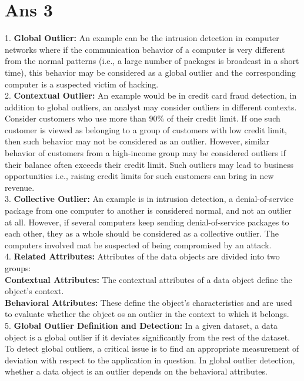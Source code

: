 \documentclass[10pt]{article}
\begin{document}
\section*{Ans 3}
\begin{flushleft}
1. \textbf{Global Outlier:} An example can be the intrusion detection in computer networks where if the communication behavior of a computer is very different from the normal patterns (i.e., a large number of packages is broadcast in a short time), this behavior may be considered as a global outlier and the corresponding computer is a suspected victim of hacking.\\
\vspace{0.5em}
2. \textbf{Contextual Outlier:} An example would be in credit card fraud detection, in addition to global outliers, an analyst may consider outliers in different contexts. Consider customers who use more than 90\% of their credit limit. If one such customer is viewed as belonging to a group of customers with low credit limit, then such behavior may not be considered as an outlier. However, similar behavior of customers from a high-income group may be considered outliers if their balance often exceeds their credit limit. Such outliers may lead to business opportunities i.e., raising credit limits for such customers can bring in new revenue.\\
\vspace{0.5em}
3. \textbf{Collective Outlier:} An example is in intrusion detection, a denial-of-service package from one computer to another is considered normal, and not an outlier at all. However, if several computers keep sending denial-of-service packages to each other, they as a whole should be considered as a collective outlier. The computers involved mat be suspected of being compromised by an attack.\\
\vspace{0.5em}
4. \textbf{Related Attributes:} Attributes of the data objects are divided into two groups:\\
\textbf{Contextual Attributes:} The contextual attributes of a data object define the object's context.\\
\textbf{Behavioral Attributes:} These define the object's characteristics and are used to evaluate whether the object os an outlier in the context to which it belongs.\\
\vspace{0.5em}
5. \textbf{Global Outlier Definition and Detection:} In a given dataset, a data object is a global outlier if it deviates significantly from the rest of the dataset. To detect global outliers, a critical issue is to find an appropriate measurement of deviation with respect to the application in question. In global outlier detection, whether a data object is an outlier depends on the behavioral attributes.\\

\end{flushleft}
\end{document}
